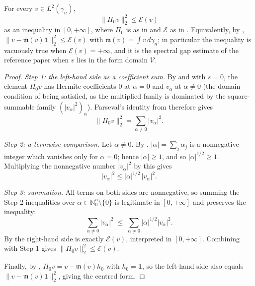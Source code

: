 \begin{lemma}
For every $v \in L^2(\gamma_n)$,
\[
  \|\Pi_0 v\|_2^2 \leq \mathcal{E}(v)
\]
as an inequality in $[0,+\infty]$, where $\Pi_0$ is as in  and
$\mathcal{E}$ as in .  Equivalently, by
,
$\|v - \mathfrak{m}(v)\mathbf{1}\|_2^2 \leq \mathcal{E}(v)$ with
$\mathfrak{m}(v) = \int v \, d\gamma_n$; in particular the inequality is vacuously
true when $\mathcal{E}(v) = +\infty$, and it is the spectral gap estimate of the
reference paper when $v$ lies in the form domain $\mathcal{V}$.
\end{lemma}
\begin{proof}
\emph{Step 1: the left-hand side as a coefficient sum.}
By  and  with $s = 0$, the element
$\Pi_0 v$ has Hermite coefficients $0$ at $\alpha = 0$ and $v_\alpha$ at
$\alpha \neq 0$ (the domain condition of  being satisfied,
as the multiplied family is dominated by the square-summable family
$(|v_\alpha|^2)_\alpha$).  Parseval's identity from 
therefore gives
\[
  \|\Pi_0 v\|_2^2 = \sum_{\alpha \neq 0} |v_\alpha|^2 .
\]

\emph{Step 2: a termwise comparison.}
Let $\alpha \neq 0$.  By , $|\alpha| = \sum_j \alpha_j$ is
a nonnegative integer which vanishes only for $\alpha = 0$; hence
$|\alpha| \geq 1$, and so $|\alpha|^{1/2} \geq 1$.  Multiplying the nonnegative
number $|v_\alpha|^2$ by this gives
\[
  |v_\alpha|^2 \leq |\alpha|^{1/2}\,|v_\alpha|^2 .
\]

\emph{Step 3: summation.}
All terms on both sides are nonnegative, so summing the Step-2 inequalities over
$\alpha \in \mathbb{N}_0^n \setminus\{0\}$ is legitimate in $[0,+\infty]$ and
preserves the inequality:
\[
  \sum_{\alpha \neq 0} |v_\alpha|^2
    \;\leq\; \sum_{\alpha \neq 0} |\alpha|^{1/2}|v_\alpha|^2 .
\]
By  the right-hand side is exactly $\mathcal{E}(v)$, interpreted in
$[0,+\infty]$.  Combining with Step 1 gives
$\|\Pi_0 v\|_2^2 \leq \mathcal{E}(v)$.

Finally, by , $\Pi_0 v = v - \mathfrak{m}(v)h_0$ with
$h_0 = \mathbf{1}$, so the left-hand side also equals
$\|v - \mathfrak{m}(v)\mathbf{1}\|_2^2$, giving the centred form.
\end{proof}
